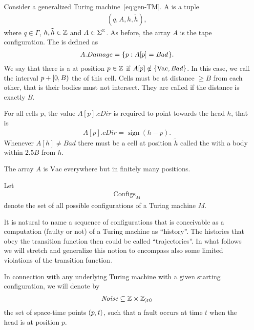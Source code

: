 \documentclass[12pt]{memoir}
\newcommand{\fld}[1]{\ensuremath{\textit{#1}}}
\newcommand{\sign}{\mathop\mathrm{sign}}
\def\B{B}
\newcommand{\Bad}{\mathit{Bad}}
\newcommand{\Configs}{\mathrm{Configs}}
\newcommand{\Damage}{Damage}
\newcommand{\h}{h}
\newcommand{\hc}{\tilde h}
\newcommand{\Noise}{\mathit{Noise}}
\newcommand{\cDir}{\fld{cDir}}
\newcommand{\Vacant}{\mathrm{Vac}}
\begin{document}
\begin{definition}[Configuration]\label{def:config}
     Consider a generalized Turing machine~\eqref{eq:gen-TM}.
    A  is a tuple
        \begin{align*}
             (q,A,\h,\hc),
        \end{align*}
    where \( q\in\Gamma \), \( \h,\hc\in\bbZ \) and \( A\in\Sigma^{\mathbb{Z}} \).
As before, the array \( A \) is the tape configuration.
The  is defined as
     \begin{align*}
          A.\Damage=\setOf{p}{A[p]=\Bad}.
     \end{align*}
We say that there is a  at position \( p\in\mathbb{Z} \) if
\( A[p]\notin \set{\Vacant, \Bad} \).
In this case, we call the interval \( p+\lint{0}{\B} \) the  of this cell.
Cells must be at distance \( \ge\B \) from each other, that is their
bodies must not intersect.
They are called  if the distance is exactly \( \B \).

For all cells \( p \), the value \( A[p].\cDir \) is required to point towards 
the head \( \h \), that is 
 \begin{align*}
   A[p].\cDir=\sign(\h-p).
 \end{align*}
Whenever \( A[\h]\neq \Bad \) there must be a
cell at position \( \hc \) called the  with a body 
within \( 2.5\B \) from \( \h \).

The array \( A \) is \( \Vacant \) everywhere but in finitely many positions.

Let
    \begin{align*}
         \Configs_{M}
    \end{align*}
    denote the set of all possible configurations
    of a Turing machine \( M \).
\end{definition}


It is natural to name a sequence of configurations that is conceivable as a computation
(faulty or not) of a Turing machine as ``history''.
The histories that obey the transition function then could be called ``trajectories''.
In what follows we will 
stretch and generalize this notion to encompass also some limited violations of the
transition function.

In connection with any underlying Turing machine with a given starting configuration, we will
denote by
\begin{align}\label{eq:noise-first}
   \Noise\subseteq \bbZ\times \bbZ_{\ge 0}
\end{align}
the set of space-time points \( (p,t) \), such that
a fault occurs at time \( t \) when the head is at position \( p \).
\end{document}
